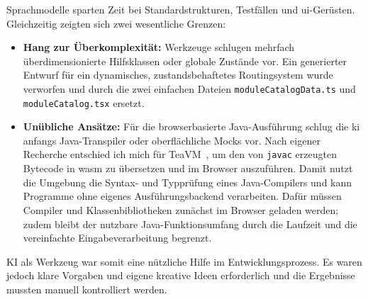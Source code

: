 Sprachmodelle sparten Zeit bei Standardstrukturen, Testfällen und \gls{ui}-Gerüsten. Gleichzeitig zeigten sich zwei wesentliche Grenzen:
\begin{itemize}
  \item \textbf{Hang zur Überkomplexität:} Werkzeuge schlugen mehrfach überdimensionierte Hilfsklassen oder globale Zustände vor. Ein generierter Entwurf für ein dynamisches, zustandsbehaftetes Routingsystem wurde verworfen und durch die zwei einfachen Dateien \verb|moduleCatalogData.ts| und \verb|moduleCatalog.tsx| ersetzt.
  \item \textbf{Unübliche Ansätze:} Für die browserbasierte Java-Ausführung schlug die \gls{ki} anfangs Java-Transpiler oder oberflächliche Mocks vor. Nach eigener Recherche entschied ich mich für TeaVM~\cite{teavm}, um den von \texttt{javac} erzeugten Bytecode in \gls{wasm} zu übersetzen und im Browser auszuführen. Damit nutzt die Umgebung die Syntax- und Typprüfung eines Java-Compilers und kann Programme ohne eigenes Ausführungsbackend verarbeiten. Dafür müssen Compiler und Klassenbibliotheken zunächst im Browser geladen werden; zudem bleibt der nutzbare Java-Funktionsumfang durch die Laufzeit und die vereinfachte Eingabeverarbeitung begrenzt.
\end{itemize}

KI als Werkzeug war somit eine nützliche Hilfe im Entwicklungsprozess. Es waren jedoch klare Vorgaben und eigene kreative Ideen erforderlich und die Ergebnisse mussten manuell kontrolliert werden.
